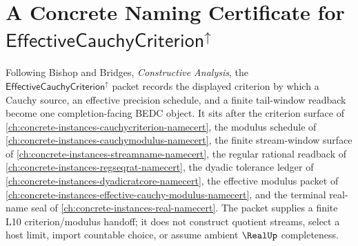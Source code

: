 \chapter{A Concrete Naming Certificate for $\mathsf{EffectiveCauchyCriterion}^{\uparrow}$}
\label{ch:concrete-instances-effective-cauchy-criterion-namecert}

Following Bishop and Bridges, \emph{Constructive Analysis}, the $\mathsf{EffectiveCauchyCriterion}^{\uparrow}$ packet records the displayed criterion by which a Cauchy source, an effective precision schedule, and a finite tail-window readback become one completion-facing BEDC object. It sits after the criterion surface of \autoref{ch:concrete-instances-cauchycriterion-namecert}, the modulus schedule of \autoref{ch:concrete-instances-cauchymodulus-namecert}, the finite stream-window surface of \autoref{ch:concrete-instances-streamname-namecert}, the regular rational readback of \autoref{ch:concrete-instances-regseqrat-namecert}, the dyadic tolerance ledger of \autoref{ch:concrete-instances-dyadicratcore-namecert}, the effective modulus packet of \autoref{ch:concrete-instances-effective-cauchy-modulus-namecert}, and the terminal real-name seal of \autoref{ch:concrete-instances-real-namecert}. The packet supplies a finite L10 criterion/modulus handoff; it does not construct quotient streams, select a host limit, import countable choice, or assume ambient $\RealUp$ completeness.

